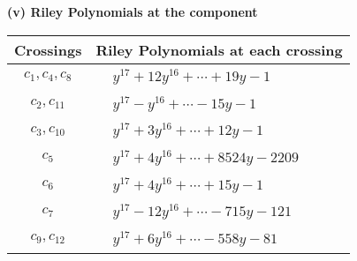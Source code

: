 \documentclass[1p]{elsarticle_modified}
\theoremstyle{definition}
\begin{document}
\newpage\renewcommand{\arraystretch}{1}
\flushleft \textbf{(v) Riley Polynomials at the component}\newline \\
\begin{tabular}{m{50pt}|m{274pt}}
Crossings & \hspace{64pt}Riley Polynomials at each crossing \\
\hline $$\begin{aligned}c_{1},c_{4},c_{8}\end{aligned}$$&$\begin{aligned}
&y^{17}+12 y^{16}+\cdots+19 y-1
\end{aligned}$\\
\hline $$\begin{aligned}c_{2},c_{11}\end{aligned}$$&$\begin{aligned}
&y^{17}- y^{16}+\cdots-15 y-1
\end{aligned}$\\
\hline $$\begin{aligned}c_{3},c_{10}\end{aligned}$$&$\begin{aligned}
&y^{17}+3 y^{16}+\cdots+12 y-1
\end{aligned}$\\
\hline $$\begin{aligned}c_{5}\end{aligned}$$&$\begin{aligned}
&y^{17}+4 y^{16}+\cdots+8524 y-2209
\end{aligned}$\\
\hline $$\begin{aligned}c_{6}\end{aligned}$$&$\begin{aligned}
&y^{17}+4 y^{16}+\cdots+15 y-1
\end{aligned}$\\
\hline $$\begin{aligned}c_{7}\end{aligned}$$&$\begin{aligned}
&y^{17}-12 y^{16}+\cdots-715 y-121
\end{aligned}$\\
\hline $$\begin{aligned}c_{9},c_{12}\end{aligned}$$&$\begin{aligned}
&y^{17}+6 y^{16}+\cdots-558 y-81
\end{aligned}$\\
\hline
\end{tabular}\\~\\
\end{document}
